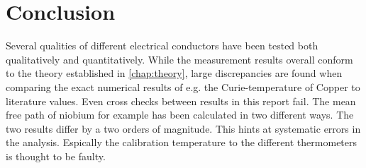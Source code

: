 
\section{Conclusion}
\label{sec:conclusion}

Several qualities of different electrical conductors have been tested both 
qualitatively and quantitatively. While the measurement results overall conform to
the theory established in \autoref{chap:theory}, large discrepancies are found when 
comparing the exact numerical results of e.g. the Curie-temperature of Copper to 
literature values. Even cross checks between results in this report fail. The mean
free path of niobium for example has been calculated in two different ways. The two
results differ by a two orders of magnitude. This hints at systematic errors in the 
analysis. Espically the calibration temperature to the different thermometers is 
thought to be faulty.
